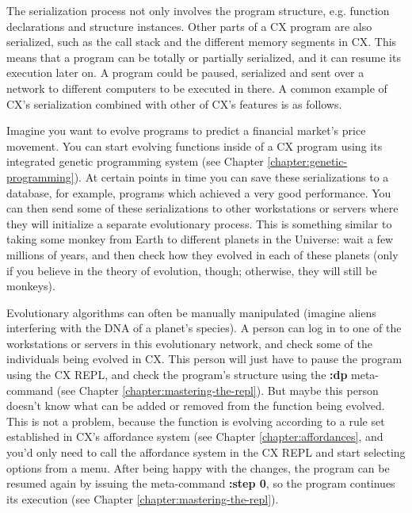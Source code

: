 \documentclass[11pt,fleqn,openany]{book} %
\begin{document}
The serialization process not only involves the program structure, e.g. function declarations and structure instances. Other parts of a CX program are also serialized, such as the call stack and the different memory segments in CX. This means that a program can be totally or partially serialized, and it can resume its execution later on. A program could be paused, serialized and sent over a network to different computers to be executed in there. A common example of CX's serialization combined with other of CX's features is as follows.

Imagine you want to evolve programs to predict a financial market's price movement. You can start evolving functions inside of a CX program using its integrated genetic programming system (see Chapter \ref{chapter:genetic-programming}). At certain points in time you can save these serializations to a database, for example, programs which achieved a very good performance. You can then send some of these serializations to other workstations or servers where they will initialize a separate evolutionary process. This is something similar to taking some monkey from Earth to different planets in the Universe: wait a few millions of years, and then check how they evolved in each of these planets (only if you believe in the theory of evolution, though; otherwise, they will still be monkeys).

Evolutionary algorithms can often be manually manipulated (imagine aliens interfering with the DNA of a planet's species). A person can log in to one of the workstations or servers in this evolutionary network, and check some of the individuals being evolved in CX. This person will just have to pause the program using the CX REPL, and check the program's structure using the \textbf{:dp} meta-command (see Chapter \ref{chapter:mastering-the-repl}). But maybe this person doesn't know what can be added or removed from the function being evolved. This is not a problem, because the function is evolving according to a rule set established in CX's affordance system (see Chapter \ref{chapter:affordances}, and you'd only need to call the affordance system in the CX REPL and start selecting options from a menu. After being happy with the changes, the program can be resumed again by issuing the meta-command \textbf{:step 0}, so the program continues its execution (see Chapter \ref{chapter:mastering-the-repl}).

\end{document}
